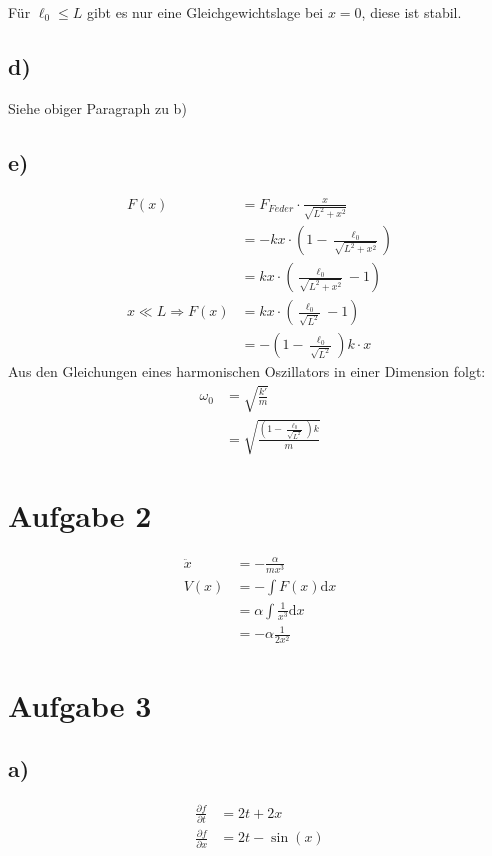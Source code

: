 \documentclass[12pt,a4paper,notitlepage]{article}
\newcommand{\diff}{\mathrm{d}}
\newcommand{\aufgabe}[1]{\section*{\setcounter{section}{#1}Aufgabe #1}}
\begin{document}
Für $\ell_0\leq L$ gibt es nur eine Gleichgewichtslage bei $x=0$, diese ist stabil.
\subsection*{d)}
Siehe obiger Paragraph zu b)
\subsection*{e)}
\begin{align}
F(x)&=F_{Feder}\cdot\frac{x}{\sqrt{L^2+x^2}}\\
&=-kx\cdot\left(1-\frac{\ell_0}{\sqrt{L^2+x^2}}\right)\\
&=kx\cdot\left(\frac{\ell_0}{\sqrt{L^2+x^2}}-1\right)\\
x\ll L\Rightarrow F(x)&=kx\cdot\left(\frac{\ell_0}{\sqrt{L^2}}-1\right)\\
&=-\left(1-\frac{\ell_0}{\sqrt{L^2}}\right)k\cdot x
\end{align}
Aus den Gleichungen eines harmonischen Oszillators in einer Dimension folgt:
\begin{align}
\omega_0&=\sqrt{\frac{k'}{m}}\\
&=\sqrt{\frac{\left(1-\frac{\ell_0}{\sqrt{L^2}}\right)k}{m}}
\end{align}
\aufgabe{2}
\begin{align}
\ddot x&=-\frac{\alpha}{mx^3}\\
V(x)&=-\int F(x)\diff x\\
&=\alpha\int\frac{1}{x^3}\diff x\\
&=-\alpha\frac{1}{2x^2}
\end{align}
\aufgabe{3}
\subsection*{a)}
\begin{align}
\frac{\partial f}{\partial t}&=2t+2x\\
\frac{\partial f}{\partial x}&=2t-\sin(x)
\end{align}
\end{document}
